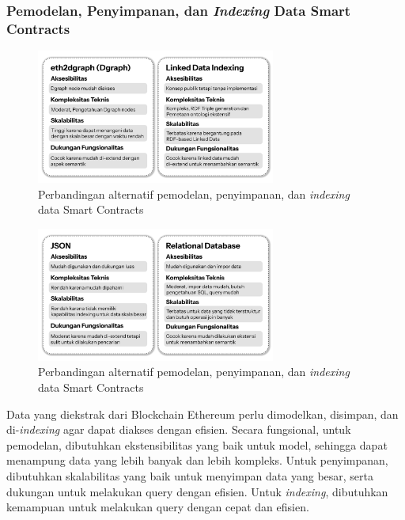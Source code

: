 \subsubsection{Pemodelan, Penyimpanan, dan \textit{Indexing} Data Smart Contracts}


\begin{figure}[ht]
	\centering
	\includegraphics[width=0.7\textwidth]{resources/chapter-3/pemodelan-1.png}
	\caption{Perbandingan alternatif pemodelan, penyimpanan, dan \textit{indexing} data Smart Contracts}
	\label{image:pemodelan-1}
\end{figure}

\begin{figure}[ht]
	\centering
	\includegraphics[width=0.7\textwidth]{resources/chapter-3/pemodelan-2.png}
	\caption{Perbandingan alternatif pemodelan, penyimpanan, dan \textit{indexing} data Smart Contracts}
	\label{image:pemodelan-2}
\end{figure}

Data yang diekstrak dari Blockchain Ethereum perlu dimodelkan, disimpan, dan di-\textit{indexing} agar dapat diakses dengan efisien. Secara fungsional, untuk pemodelan, dibutuhkan ekstensibilitas yang baik untuk model, sehingga dapat menampung data yang lebih banyak dan lebih kompleks. Untuk penyimpanan, dibutuhkan skalabilitas yang baik untuk menyimpan data yang besar, serta dukungan untuk melakukan query dengan efisien. Untuk \textit{indexing}, dibutuhkan kemampuan untuk melakukan query dengan cepat dan efisien.

